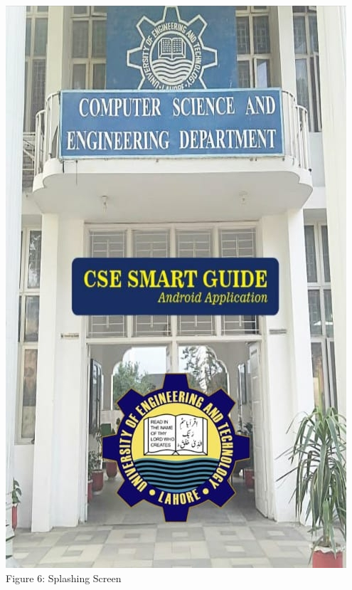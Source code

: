 \documentclass{article}
\begin{document}
\begin{center}

\includegraphics[scale=0.3]{f1}
\\Figure 6: Splashing Screen
\end{center}
\end{document}

